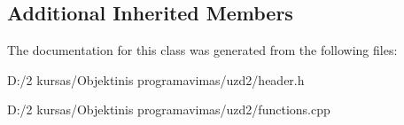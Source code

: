 \subsection*{Additional Inherited Members}


The documentation for this class was generated from the following files\+:\begin{DoxyCompactItemize}
\item 
D\+:/2 kursas/\+Objektinis programavimas/uzd2/header.\+h\item 
D\+:/2 kursas/\+Objektinis programavimas/uzd2/functions.\+cpp\end{DoxyCompactItemize}
